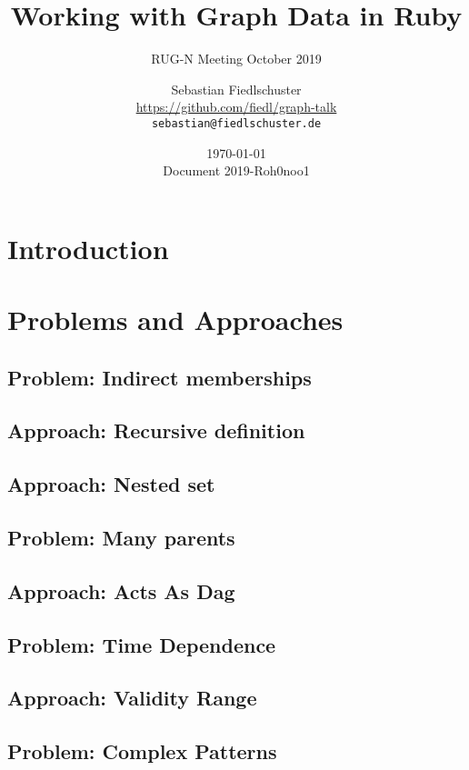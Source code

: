 \documentclass[green, 12pt]{beamer}
\title[Working with Graph Data in Ruby, \url{https://github.com/fiedl/graph-talk}]{Working with Graph Data in Ruby}
\subtitle{RUG-N Meeting October 2019}
\date{\today \\ \vspace*{2mm} \tiny{Document 2019-Roh0noo1} \normalsize}
\author[Sebastian Fiedlschuster]{Sebastian Fiedlschuster \\ \small{\url{https://github.com/fiedl/graph-talk}} \\ \small\texttt{sebastian@fiedlschuster.de}}
\begin{document}



\section{Introduction}


\section{Problems and Approaches}
\subsection{Problem: Indirect memberships}

\subsection{Approach: Recursive definition}

\subsection{Approach: Nested set}

\subsection{Problem: Many parents}

\subsection{Approach: Acts As Dag}

\subsection{Problem: Time Dependence}

\subsection{Approach: Validity Range}

\subsection{Problem: Complex Patterns}

\end{document}
